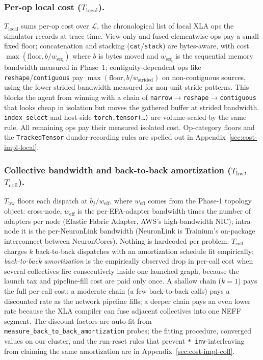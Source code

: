 \subsubsection{Per-op local cost ($T_{\text{local}}$).}
$T_{\text{local}}$ sums per-op cost over $\mathcal{L}$, the
chronological list of local XLA ops
the simulator records at trace time. View-only and fused-elementwise
ops pay a small fixed floor; concatenation and stacking
(\texttt{cat}/\texttt{stack}) are bytes-aware, with cost
$\max(\text{floor}, b/w_{\text{seq}})$ where $b$ is bytes moved and
$w_{\text{seq}}$ is the sequential memory bandwidth measured in
Phase~1; contiguity-dependent ops like \texttt{reshape}/\texttt{contiguous}
pay $\max(\text{floor}, b/w_{\text{strided}})$ on non-contiguous
sources, using the lower strided bandwidth measured for non-unit-stride
patterns. This blocks the agent from winning with a chain of
\texttt{narrow}$\to$\texttt{reshape}$\to$\texttt{contiguous} that
looks cheap in isolation but moves the gathered buffer at strided
bandwidth. \texttt{index\_select} and host-side
\texttt{torch.tensor(\ldots)} are volume-scaled by the same rule.
All remaining ops pay their measured isolated cost. Op-category
floors and the \texttt{TrackedTensor} dunder-recording rules are
spelled out in Appendix~\ref{sec:cost-impl-local}.

\subsubsection{Collective bandwidth and back-to-back amortization
($T_{\text{bw}}$, $T_{\text{coll}}$).}
$T_{\text{bw}}$ floors each dispatch at $b_j / w_{\text{eff}}$,
where $w_{\text{eff}}$ comes from the Phase-1 topology object:
cross-node, $w_{\text{eff}}$ is the per-EFA-adapter bandwidth times
the number of adapters per node (Elastic Fabric Adapter, AWS's
high-bandwidth NIC); intra-node it is the per-NeuronLink bandwidth
(NeuronLink is Trainium's on-package interconnect between
NeuronCores). Nothing is hardcoded per problem. $T_{\text{coll}}$
charges $k$ back-to-back dispatches with an amortization schedule
fit empirically: \emph{back-to-back amortization} is the
empirically observed drop in per-call cost when several
collectives fire consecutively inside one launched graph, because
the launch tax and pipeline-fill cost are paid only once. A
shallow chain ($k=1$) pays the full per-call cost; a moderate
chain (a few back-to-back calls) pays a discounted rate as the
network pipeline fills; a deeper chain pays an even lower rate
because the XLA compiler can fuse adjacent collectives into one
NEFF segment. The discount factors are auto-fit from
\texttt{measure\_back\_to\_back\_amortization} probes; the
fitting procedure, converged values on our cluster, and the
run-reset rules that prevent
\texttt{*\,inv}-interleaving from claiming the same amortization
are in Appendix~\ref{sec:cost-impl-coll}.

